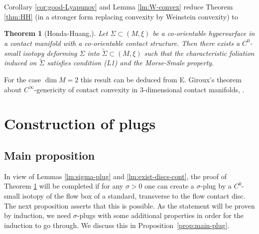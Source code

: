 \documentclass[12pt]{amsart}
\theoremstyle{plain}
\newtheorem{theorem}{Theorem}[section]
\theoremstyle{definition}
\theoremstyle{remark}
\newcommand{\wt}{\widetilde}
\begin{document}
Corollary  \ref{cor:good-Lyapunov} and 
Lemma  \ref{lm:W-convex}  reduce  Theorem \ref{thm:HH} (in a stronger form replacing convexity by Weinstein convexity)  to
\begin{theorem}[Honda-Huang,\cite{HH}]\label{thm:main-precise}
Let $\Sigma\subset (M,\xi)$ be a co-orientable hypersurface in a contact manifold with a co-orientable contact structure. Then there exists a $C^0$-small isotopy deforming $\Sigma $ into $\wt\Sigma\subset (M,\xi)$ such that the characteristic foliation induced on $\wt \Sigma$  satisfies condition  (L1) and the Morse-Smale property.   
\end{theorem}
For the case  $\dim M=2$   this result can be deduced from    E. Giroux's theorem about $C^\infty$-genericity of contact convexity in $3$-dimensional contact manifolds, \cite{Gi}.
 
  \section{Construction of plugs}\label{sec:plugs}
     \subsection{Main proposition}

In view  of Lemmas \ref{lm:sigma-plug}  and \ref{lm:exist-discs-cont}, the proof of Theorem \ref{thm:main-precise} will be completed if  for any $\sigma>0$ one    can  create a  $\sigma$-plug by a $C^0$-small isotopy of the flow box of a  standard, transverse to the flow contact disc. The next proposition asserts that this is possible. As the statement will be proven by induction, we need   $\sigma$-plugs with some additional properties  in order for the induction to go through.
We discuss this in Proposition~\ref{prop:main-plug}.
\end{document}
